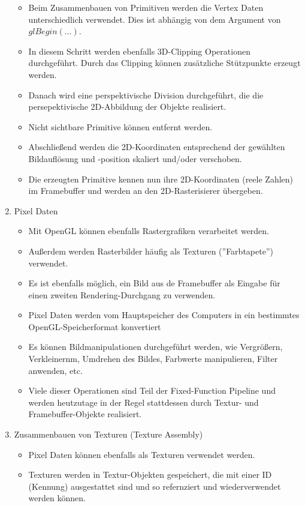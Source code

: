 \documentclass{scrartcl}
\begin{document}
\begin{enumerate}
	\begin{itemize}
		\item Beim Zusammenbauen von Primitiven werden die Vertex Daten unterschiedlich verwendet. Dies ist abhängig von dem Argument von $glBegin(\ldots)$.
		\item In diesem Schritt werden ebenfalls 3D-Clipping Operationen durchgeführt. Durch das Clipping können zusätzliche Stützpunkte erzeugt werden.
		\item Danach wird eine perspektivische Division durchgeführt, die die persepektivische 2D-Abbildung der Objekte realisiert.
		\item Nicht sichtbare Primitive können entfernt werden.
		\item Abschließend werden die 2D-Koordinaten entsprechend der gewählten Bildauflösung und -position skaliert und/oder verschoben.
		\item Die erzeugten Primitive kennen nun ihre 2D-Koordinaten (reele Zahlen) im Framebuffer und werden an den 2D-Rasterisierer übergeben.
	\end{itemize}
	\item Pixel Daten
	\begin{itemize}
		\item Mit OpenGL können ebenfalls Rastergrafiken verarbeitet werden.
		\item Außerdem werden Rasterbilder häufig als Texturen (''Farbtapete'') verwendet.
		\item Es ist ebenfalls möglich, ein Bild aus de Framebuffer als Eingabe für einen zweiten Rendering-Durchgang zu verwenden.
		\item Pixel Daten werden vom Hauptspeicher des Computers in ein bestimmtes OpenGL-Speicherformat konvertiert
		\item Es können Bildmanipulationen durchgeführt werden, wie Vergrößern, Verkleinernm, Umdrehen des Bildes, Farbwerte manipulieren, Filter anwenden, etc.
		\item Viele dieser Operationen sind Teil der Fixed-Function Pipeline und werden heutzutage in der Regel stattdessen durch Textur- und Framebuffer-Objekte realisiert.
	\end{itemize}
	\item Zusammenbauen von Texturen (Texture Assembly)
	\begin{itemize}
		\item Pixel Daten können ebenfalls als Texturen verwendet werden.
		\item Texturen werden in Textur-Objekten gespeichert, die mit einer ID (Kennung) ausgestattet sind und so refernziert und wiederverwendet werden können.

\end{itemize}
\end{enumerate}
\end{document}
